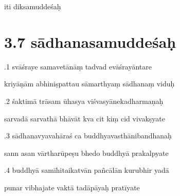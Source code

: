 \documentclass[article,12pt,a4paper]{memoir}%
\newcounter{parCount}
\begin{document}
	  
	  \pstart \leavevmode%
	iti diksamuddeśaḥ
	{}
	\pend%
      
	  
	
\chapter[{3.7 sādhanasamuddeśaḥ}][{3.7 sādhanasamuddeśaḥ}]{ 3.7 sādhanasamuddeśaḥ}

	  
	  \pstart {}.1 svāśraye samavetānāṃ tadvad evāśrayāntare 
	{}
	\pend%
      

	  
	  \pstart \leavevmode%
	kriyāṇām abhiniṣpattau sāmarthyaṃ sādhanaṃ viduḥ 
	{}
	\pend%
      

	  
	  \pstart {}.2 śaktimā trāsam ūhasya viśvasyānekadharmaṇaḥ 
	{}
	\pend%
      

	  
	  \pstart \leavevmode%
	sarvadā sarvathā bhāvāt kva cit kiṃ cid vivakṣyate 
	{}
	\pend%
      

	  
	  \pstart {}.3 sādhanavyavahāraś ca buddhyavasthānibandhanaḥ 
	{}
	\pend%
      

	  
	  \pstart \leavevmode%
	sann asan vārtharūpeṣu bhedo buddhyā prakalpyate 
	{}
	\pend%
      

	  
	  \pstart {}.4 buddhyā samīhitaikatvān pañcālān kurubhir yadā 
	{}
	\pend%
      

	  
	  \pstart \leavevmode%
	punar vibhajate vaktā tadāpāyaḥ pratīyate 
	{}
	\pend%
      
\end{document}
